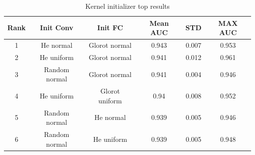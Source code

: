 \begin{center}
  \begin{table}
    \begin{tabular}{|c c c c c c|} 
      \hline\hline
      Rank & Init Conv & Init FC & Mean AUC & STD & MAX AUC\\ [0.5ex] 
      \hline
      1 & He normal & Glorot normal & 0.943 & 0.007 & 0.953 \\ 
      \hline
      2 & He uniform & Glorot normal & 0.941 & 0.012 & 0.961 \\
      \hline
      3 & Random normal & Glorot normal & 0.941 & 0.004 & 0.946 \\
      \hline
      4 & He uniform & Glorot uniform & 0.94 & 0.008 & 0.952\\
      \hline
      5 & Random normal & He normal & 0.939 & 0.005 & 0.946\\
      \hline
      6 & Random normal & He uniform & 0.939 & 0.005 & 0.948\\
      \hline \hline
    \end{tabular}
  \caption{Kernel initializer top results}
  \label{table:kernel_init}
\end{table} 
\end{center}


